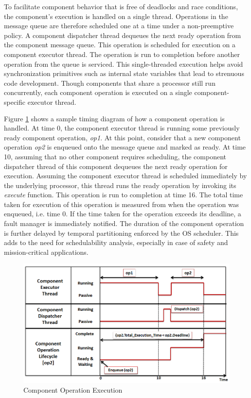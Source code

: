 To facilitate component behavior that is free of deadlocks and race conditions, the component's execution is handled on a single thread. Operations in the message queue are therefore scheduled one at a time under a non-preemptive policy. A component dispatcher thread dequeues the next ready operation from the component message queue. This operation is scheduled for execution on a component executor thread. The operation is run to completion before another operation from the queue is serviced. This single-threaded execution helps avoid synchronization primitives such as internal state variables that lead to strenuous code development. Though components that share a processor still run concurrently, each component operation is executed on a single component-specific executor thread.

Figure \ref{fig:timing_diagram} shows a sample timing diagram of how a component operation is handled. At time 0, the component executor thread is running some previously ready component operation, \emph{op1}. At this point, consider that a new component operation \emph{op2} is enqueued onto the message queue and marked as ready. At time 10, assuming that no other component requires scheduling, the component dispatcher thread of this component dequeues the next ready operation for execution. Assuming the component executor thread is scheduled immediately by the underlying processor, this thread runs the ready operation by invoking its \emph{execute} function. This operation is run to completion at time 16. The total time taken for execution of this operation is measured from when the operation was enqueued, i.e. time 0. If the time taken for the operation exceeds its deadline, a fault manager is immediately notified. The duration of the component operation is further delayed by temporal partitioning enforced by the OS scheduler. This adds to the need for schedulability analysis, especially in case of safety and mission-critical applications.

\begin{figure}[ht]
	\centering
	\includegraphics[width=\textwidth]{./figs/cop_timing_diagram}
	\caption{Component Operation Execution}
	\label{fig:timing_diagram}
\end{figure}

